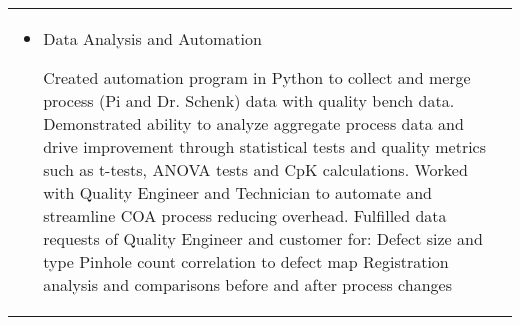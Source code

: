 \documentclass[a4paper, oneside, final, fontsize=9pt, usegeometry]{scrartcl} %
\begin{document}
\begin{center}
\begin{tabularx}{0.97\linewidth}{XX}
\begin{itemize}
        \item{Data Analysis and Automation}
        \begin{sloppypar}
            Created automation program in Python to collect and merge process (Pi and Dr. Schenk) data with quality bench data. Demonstrated ability to analyze aggregate process data and drive improvement through statistical tests and quality metrics such as t-tests, ANOVA tests and CpK calculations. Worked with Quality Engineer and Technician to automate and streamline COA process reducing overhead. Fulfilled data requests of Quality Engineer and customer for: Defect size and type Pinhole count correlation to defect map Registration analysis and comparisons before and after process changes
        \end{sloppypar}
    \end{itemize}
\end{tabularx}

\vspace{-8pt}


\end{center}
\end{document}
